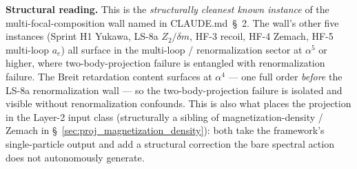 \documentclass[11pt]{article}
\begin{document}
\textbf{Structural reading.}  This is the \emph{structurally cleanest
known instance} of the multi-focal-composition wall named in
CLAUDE.md~\S~2.  The wall's other five instances (Sprint H1
Yukawa, LS-8a $Z_2/\delta m$, HF-3 recoil, HF-4 Zemach, HF-5
multi-loop $a_e$) all surface in the multi-loop / renormalization
sector at $\alpha^5$ or higher, where two-body-projection failure
is entangled with renormalization failure.  The Breit retardation
content surfaces at $\alpha^4$ --- one full order \emph{before}
the LS-8a renormalization wall --- so the two-body-projection
failure is isolated and visible without renormalization confounds.
This is also what places the projection in the Layer-2 input class
(structurally a sibling of magnetization-density / Zemach in
\S~\ref{sec:proj_magnetization_density}): both take the framework's
single-particle output and add a structural correction the bare
spectral action does not autonomously generate.
\end{document}
